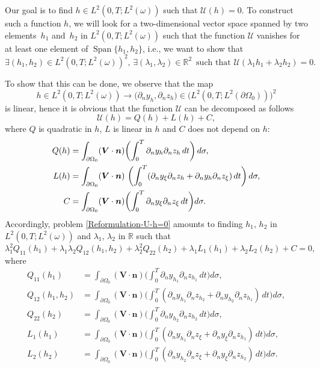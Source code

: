 \documentclass[11pt]{article}
\newcommand{\ie}{i.e.,\xspace}
\numberwithin{equation}{section}
\newcommand{\bn}{\boldsymbol{n}}
\newcommand{\bV}{\boldsymbol{V}}
\DeclareMathOperator{\Span}{Span}
\newcommand\R{{\mathbb R}}
\theoremstyle{definition}
\begin{document}
Our goal is to find $h \in L^2(0,T; L^2(\omega))$ such that $\mathcal{U}(h)= 0$. To construct such a function $h$, we will look for a two-dimensional vector space spanned by two elements~$h_1$ and~$h_2$ in $L^2(0,T; L^2(\omega))$ such that the function $\mathcal{U}$ vanishes for at least one element of $\Span \{ h_1, h_2\}$, \ie we want to show that
\begin{equation}
\label{Reformulation-U-h=0}
\exists (h_1,h_2)\in L^2(0,T; L^2(\omega))^2,\,\exists (\lambda_1, \lambda_2) \in \R^2 \, \text{ such that } \mathcal{U}(\lambda_1 h_1 + \lambda_2 h_2) = 0.
\end{equation}

To show that this can be done, we observe that the map
\[
h \in L^2(0,T; L^2(\omega)) \to \bigl(\partial_n y_h, \partial_n z_h)\in (L^2(0,T; L^2(\partial\Omega_0))\bigr)^2
\]
is linear, hence it is obvious that the function $\mathcal{U}$ can be decomposed as follows
\begin{equation*}
\mathcal{U}(h)=Q(h)+L(h)+C,
\end{equation*}
where $Q$ is quadratic in $h$, $L$ is linear in $h$ and $C$ does not depend on $h$:
\begin{align}
Q(h)&= \int_{\partial \Omega_0} (\bV\cdot \bn)
\biggl(\int_0^T \partial_{n} y_{h}\partial_{n} z_{h}\, dt\biggr)\, d\sigma,
\label{quadra}
\\
L(h)&= \int_{\partial \Omega_0}(\bV\cdot \bn) \
\biggl(\int_0^T (\partial_{n} y_{\xi}\partial_{n} z_{h}+\partial_{n} y_{h}\partial_{n} z_{\xi})\, dt \biggr)\,d\sigma,
\notag
\\
C&= \int_{\partial \Omega_0} (\bV\cdot \bn)
\biggl(\int_0^T \partial_{n} y_{\xi}\partial_{n} z_{\xi}\, dt \biggr)
d\sigma.
\notag
\end{align}
Accordingly, problem \eqref{Reformulation-U-h=0} amounts to finding $h_1,\,h_2$ in $L^2(0,T; L^2(\omega))$ and $\lambda_1,\,\lambda_2$ in $\R$ such that
\begin{equation}
\label{eqM1}
\lambda_1^2Q_{11}(h_1)+\lambda_1\lambda_2 Q_{12}(h_1,h_2)+\lambda_2^2Q_{22}(h_2)
+\lambda_1 L_{1}(h_1)+\lambda_2 L_2(h_2)+C=0,
\end{equation}
where
\begin{align*}
Q_{11}(h_1)&= \int_{\partial \Omega_0} (\bV \cdot \bn)
\biggl(\int_0^T \partial_{n} y_{h_1}\partial_{n} z_{h_1}\, dt\biggr) d\sigma,
\\
Q_{12}(h_1,h_2)&= \int_{\partial \Omega_0}(\bV\cdot \bn) \biggl(\int_0^T (\partial_{n} y_{h_1}\partial_{n} z_{h_2}+\partial_{n} y_{h_2}\partial_{n} z_{h_1})\, dt\biggr) d\sigma,
\\
Q_{22}(h_2) &= \int_{\partial \Omega_0} (\bV \cdot \bn)\biggl(\int_0^T \partial_{n} y_{h_2}\partial_{n} z_{h_2}\, dt\biggr) d\sigma,
\\
L_1(h_1) &= \int_{\partial \Omega_0} (\bV \cdot \bn)\biggl(\int_0^T (\partial_{n} y_{h_1}\partial_{n} z_{\xi}+\partial_{n} y_{\xi}\partial_{n} z_{h_1})\, dt\biggr) d\sigma,
\\
L_2(h_2) &= \int_{\partial\Omega_0} (\bV \cdot \bn)\biggl(\int_0^T(\partial_{n} y_{h_2}\partial_{n} z_{\xi}+\partial_{n} y_{\xi}\partial_{n} z_{h_2})\, dt \biggr)d\sigma.
\end{align*}
\end{document}
